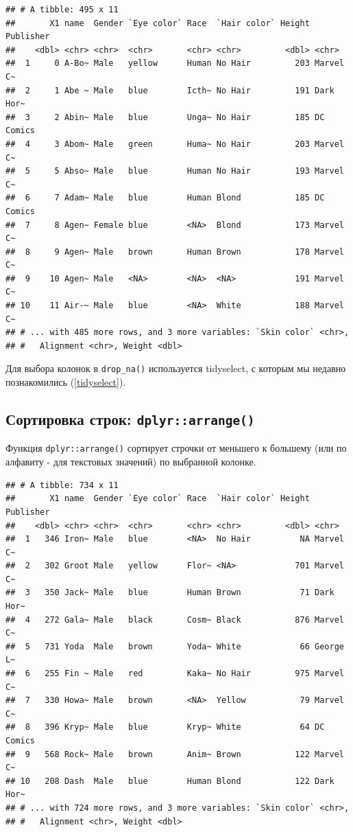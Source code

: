 \documentclass[
]{book}
\newenvironment{Shaded}{\begin{snugshade}}{\end{snugshade}}
\newcommand{\KeywordTok}[1]{\textcolor[rgb]{0.13,0.29,0.53}{\textbf{#1}}}
\newcommand{\NormalTok}[1]{#1}
\newcommand{\OperatorTok}[1]{\textcolor[rgb]{0.81,0.36,0.00}{\textbf{#1}}}
\newcommand{\StringTok}[1]{\textcolor[rgb]{0.31,0.60,0.02}{#1}}
\begin{document}
\begin{verbatim}
## # A tibble: 495 x 11
##       X1 name  Gender `Eye color` Race  `Hair color` Height Publisher
##    <dbl> <chr> <chr>  <chr>       <chr> <chr>         <dbl> <chr>    
##  1     0 A-Bo~ Male   yellow      Human No Hair         203 Marvel C~
##  2     1 Abe ~ Male   blue        Icth~ No Hair         191 Dark Hor~
##  3     2 Abin~ Male   blue        Unga~ No Hair         185 DC Comics
##  4     3 Abom~ Male   green       Huma~ No Hair         203 Marvel C~
##  5     5 Abso~ Male   blue        Human No Hair         193 Marvel C~
##  6     7 Adam~ Male   blue        Human Blond           185 DC Comics
##  7     8 Agen~ Female blue        <NA>  Blond           173 Marvel C~
##  8     9 Agen~ Male   brown       Human Brown           178 Marvel C~
##  9    10 Agen~ Male   <NA>        <NA>  <NA>            191 Marvel C~
## 10    11 Air-~ Male   blue        <NA>  White           188 Marvel C~
## # ... with 485 more rows, and 3 more variables: `Skin color` <chr>,
## #   Alignment <chr>, Weight <dbl>
\end{verbatim}

Для выбора колонок в \texttt{drop\_na()} используется tidyselect, с которым мы недавно познакомились (\ref{tidyselect}).

\hypertarget{tidy_arrange}{%
\subsection{\texorpdfstring{Сортировка строк: \texttt{dplyr::arrange()}}{Сортировка строк: dplyr::arrange()}}\label{tidy_arrange}}

Функция \texttt{dplyr::arrange()} сортирует строчки от меньшего к большему (или по алфавиту - для текстовых значений) по выбранной колонке.

\begin{Shaded}
\end{Shaded}

\begin{verbatim}
## # A tibble: 734 x 11
##       X1 name  Gender `Eye color` Race  `Hair color` Height Publisher
##    <dbl> <chr> <chr>  <chr>       <chr> <chr>         <dbl> <chr>    
##  1   346 Iron~ Male   blue        <NA>  No Hair          NA Marvel C~
##  2   302 Groot Male   yellow      Flor~ <NA>            701 Marvel C~
##  3   350 Jack~ Male   blue        Human Brown            71 Dark Hor~
##  4   272 Gala~ Male   black       Cosm~ Black           876 Marvel C~
##  5   731 Yoda  Male   brown       Yoda~ White            66 George L~
##  6   255 Fin ~ Male   red         Kaka~ No Hair         975 Marvel C~
##  7   330 Howa~ Male   brown       <NA>  Yellow           79 Marvel C~
##  8   396 Kryp~ Male   blue        Kryp~ White            64 DC Comics
##  9   568 Rock~ Male   brown       Anim~ Brown           122 Marvel C~
## 10   208 Dash  Male   blue        Human Blond           122 Dark Hor~
## # ... with 724 more rows, and 3 more variables: `Skin color` <chr>,
## #   Alignment <chr>, Weight <dbl>
\end{verbatim}
\end{document}
